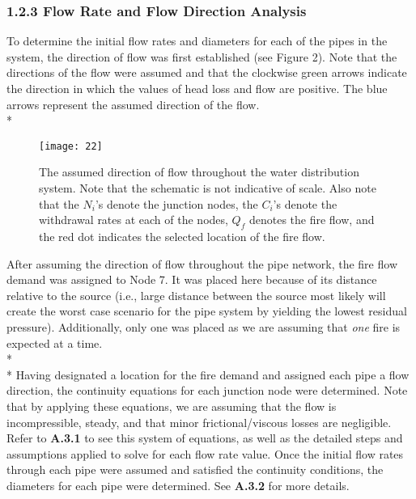 \documentclass[]{article}
\begin{document}
\subsubsection{1.2.3 Flow Rate and Flow Direction Analysis} 
\noindent
To determine the initial flow rates and diameters for each of the pipes in the system, the direction of flow was first established (see Figure 2). Note that the directions of the flow were assumed and that the clockwise green arrows indicate the direction in which the values of head loss and flow are positive. The blue arrows represent the assumed direction of the flow. \\* 
	\begin{figure}[H]
	\centering
	\texttt{[image: 22]}
	\caption[Schematic Depicting Flow Direction]{The assumed direction of flow throughout the water distribution system. Note that the schematic is not indicative of scale. Also note that the $N_i$'s denote the junction nodes, the $C_i$'s denote the withdrawal rates at each of the nodes, $Q_f$ denotes the fire flow, and the red dot indicates the selected location of the fire flow.}
\end{figure}
\vspace{0.5 cm}
\noindent After assuming the direction of flow throughout the pipe network, the fire flow demand was assigned to Node 7. It was placed here because of its distance relative to the source (i.e., large distance between the source most likely will create the worst case scenario for the pipe system by yielding the lowest residual pressure). Additionally, only one was placed as we are assuming that \textit{one} fire is expected at a time. \\* \\* 
\noindent Having designated a location for the fire demand and assigned each pipe a flow direction, the continuity equations for each junction node were determined. Note that by applying these equations, we are assuming that the flow is incompressible, steady, and that minor frictional/viscous losses are negligible. Refer to \textbf{A.3.1} to see this system of equations, as well as the detailed steps and assumptions applied to solve for each flow rate value. Once the initial flow rates through each pipe were assumed and satisfied the continuity conditions, the diameters for each pipe were determined. See \textbf{A.3.2} for more details.
\end{document}
